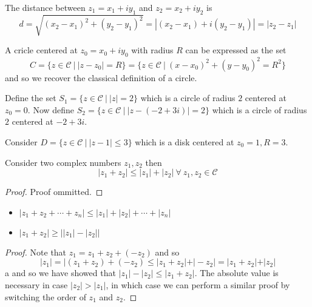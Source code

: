 \documentclass[12pt]{scrartcl}
\newcommand{\C}{\mathcal{C}}
\begin{document}
\begin{definition}[Distance]
  The distance between $z_1 = x_1 + iy_1$ and $z_2 = x_2 + iy_2$ is 
  \[d = \sqrt{(x_2 - x_1)^2 + (y_2 - y_1)^2} = |(x_2 - x_1) + i(y_2 - y_1)| = |z_2 - z_1|\]
\end{definition}

\begin{definition}[Circles]
  A cricle centered at $z_0 = x_0 + iy_0$ with radius $R$ can be expressed as the set 
  \[C = \{z \in \C \ | \ |z - z_0| = R\} = \{z \in \C \ | \ (x-x_0)^2 + (y-y_0)^2 = R^2\}\]
  and so we recover the classical definition of a circle.
\end{definition}

\begin{example}
  Define the set $S_1 = \{z \in \C \ | \ |z| = 2\}$ which is a circle of radius $2$ centered at 
  $z_0 = 0$. Now define $S_2 = \{z \in \C \ | \ |z - (-2+ 3i)| = 2\}$ which is a circle of radius $2$ 
  centered at $-2 + 3i$.
\end{example}

\begin{definition}[Disk]
  Consider $D = \{z \in \C \ | \ |z-1| \leq 3\}$ which is a disk centered at $z_0 = 1, R=3$.
\end{definition}

\begin{theorem}
  Consider two complex numbers $z_1, z_2$ then 
  \[|z_1 + z_2| \leq |z_1| + |z_2| \ \forall \ z_1, z_2 \in \C\]

  \begin{proof}
    Proof ommitted.
  \end{proof}
\end{theorem}

\begin{corollary}
  \hfill
  \begin{itemize}
    \item $|z_1 + z_2 + \cdots + z_n| \leq |z_1| + |z_2| + \cdots + |z_n|$
    \item $|z_1 + z_2| \geq \left| |z_1| - |z_2|\right|$
  \end{itemize}

  \begin{proof}
    Note that $z_1 = z_1 + z_2 +(-z_2)$ and so 
    \[|z_1| = |(z_1 + z_2) + (-z_2) \leq |z_1 + z_2| + |-z_2| = |z_1 + z_2| + |z_2|\]a
    and so we have showed that $|z_1| - |z_2| \leq |z_1 + z_2|$. The absolute value is necessary 
    in case $|z_2| > |z_1|$, in which case we can perform a similar proof by switching the order of $z_1$ and $z_2$.
  \end{proof}
\end{corollary}
\end{document}
